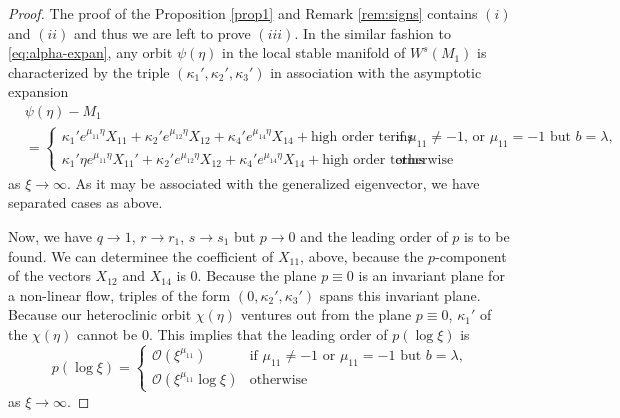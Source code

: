 \documentclass[a4paper,11pt]{article}
\def\blue{\color{blue}}
\def\BO{{\mathcal{O}}}
\theoremstyle{remark}
\begin{document}
\begin{proof}
The proof of the Proposition \ref{prop1} and Remark \ref{rem:signs} contains $(i)$ and $(ii)$ and thus we are left to prove $(iii)$. In the similar fashion to \eqref{eq:alpha-expan}, any orbit $\psi(\eta)$ in the local stable manifold of $W^s(M_1)$ is characterized by the triple $(\kappa_1',\kappa_2',\kappa_3')$ in association with the asymptotic expansion
\begin{equation}
\begin{aligned}
 &\psi(\eta) -M_1\\
 &= \begin{cases} \kappa_1'e^{\mu_{11}\eta}X_{11} + \kappa_2'e^{\mu_{12}\eta}X_{12} + \kappa_4'e^{\mu_{14}\eta}X_{14} + \text{high order terms} & \text{if $\mu_{11}\ne-1$, or $\mu_{11}=-1$ but $b=\lambda$,}\\
 \kappa_1'\eta e^{\mu_{11}\eta}X_{11}' + \kappa_2'e^{\mu_{12}\eta}X_{12} + \kappa_4'e^{\mu_{14}\eta}X_{14} + \text{high order terms} & \text{otherwise }
 \end{cases}
\end{aligned}
\end{equation}
as $\xi \rightarrow \infty$. As it may be associated with the generalized eigenvector, we have separated cases as above.

Now, we have $q \rightarrow 1$, $r \rightarrow r_1$, $s \rightarrow s_1$ but $p \rightarrow 0$ and the leading order of $p$ is to be found. We {\blue can determinee the coefficient of $X_{11}$, above, because the} $p$-component of the vectors $X_{12}$ and $X_{14}$ is $0$. Because the plane $p\equiv0$ is an invariant plane for a non-linear flow, triples of the form $(0,\kappa_2',\kappa_3')$ spans this invariant plane. Because our heteroclinic orbit $\chi(\eta)$ ventures out from the plane $p\equiv0$, $\kappa_1'$ of the $\chi(\eta)$ cannot be $0$.
This implies that the leading order of $p(\log\xi)$ is
$$p(\log\xi) = \begin{cases} \BO(\xi^{\mu_{11}}) & \text{if $\mu_{11}\ne-1$ or $\mu_{11}=-1$ but $b=\lambda$,}\\
 \BO(\xi^{\mu_{11}}\log\xi) & \text{otherwise}
 \end{cases}
 $$
as $\xi \rightarrow \infty$.


\end{proof}
\end{document}
